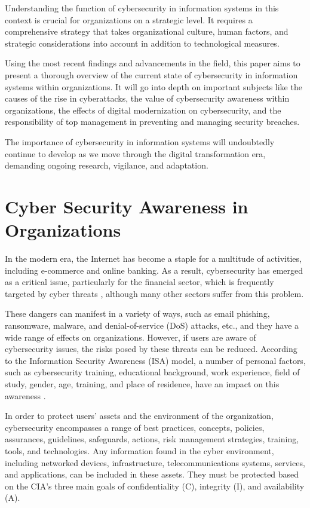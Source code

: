 \documentclass[journal]{IEEEtran}
\begin{document}
Understanding the function of cybersecurity in information systems in this context is crucial for organizations on a strategic level. It requires a comprehensive strategy that takes organizational culture, human factors, and strategic considerations into account in addition to technological measures.

Using the most recent findings and advancements in the field, this paper aims to present a thorough overview of the current state of cybersecurity in information systems within organizations. It will go into depth on important subjects like the causes of the rise in cyberattacks, the value of cybersecurity awareness within organizations, the effects of digital modernization on cybersecurity, and the responsibility of top management in preventing and managing security breaches.

The importance of cybersecurity in information systems will undoubtedly continue to develop as we move through the digital transformation era, demanding ongoing research, vigilance, and adaptation.


\section{Cyber Security Awareness in Organizations}

In the modern era, the Internet has become a staple for a multitude of activities, including e-commerce and online banking. As a result, cybersecurity has emerged as a critical issue, particularly for the financial sector, which is frequently targeted by cyber threats \cite{Edu_article1}, although many other sectors suffer from this problem. 

These dangers can manifest in a variety of ways, such as email phishing, ransomware, malware, and denial-of-service (DoS) attacks, etc., and they have a wide range of effects on organizations. However, if users are aware of cybersecurity issues, the risks posed by these threats can be reduced. According to the Information Security Awareness (ISA) model, a number of personal factors, such as cybersecurity training, educational background, work experience, field of study, gender, age, training, and place of residence, have an impact on this awareness \cite{Edu_article1}. 

In order to protect users' assets and the environment of the organization, cybersecurity encompasses a range of best practices, concepts, policies, assurances, guidelines, safeguards, actions, risk management strategies, training, tools, and technologies. Any information found in the cyber environment, including networked devices, infrastructure, telecommunications systems, services, and applications, can be included in these assets. They must be protected based on the CIA's three main goals of confidentiality (C), integrity (I), and availability (A).
\end{document}
